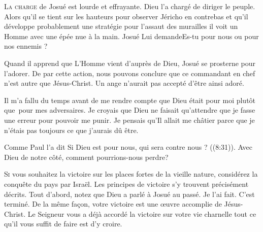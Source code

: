 \lettrine{L}{a charge} de Josué est lourde et effrayante.
 Dieu l'a chargé de diriger le peuple.
 Alors qu'il se tient sur les hauteurs pour observer Jéricho en contrebas
 \ocadr et qu'il développe probablement une stratégie
 pour l'assaut des murailles \fcadr{}
 il voit un Homme avec une épée nue à la main.
 Josué Lui demande\frcolon \Og Es-tu pour nous ou pour nos ennemis ? \Fg{}

Quand il apprend que L'Homme vient d'auprès de Dieu,
 Josué se prosterne pour l'adorer.
 De par cette action, nous pouvons conclure que ce commandant en chef
 n'est autre que Jésus-Christ. Un ange n'aurait pas accepté d'être ainsi adoré.

Il m'a fallu du temps avant de me rendre compte que Dieu
 était pour moi plutôt que~pour mes adversaires.
 Je croyais que Dieu ne faisait qu'attendre
 que je fasse une erreur pour pouvoir me punir.
 Je pensais qu'Il allait me châtier
 parce que je n'étais pas toujours ce que j'aurais dû être.


Comme Paul l'a dit\frcolon
 \Og Si Dieu est pour nous, qui sera contre nous ? \Fg{} ((8:31)).
 Avec Dieu de notre côté, comment pourrions-nous perdre? 

\dvrule






\lettrine{S}{i} vous souhaitez la victoire sur les places fortes
 de la vieille nature, considérez la conquête du pays par Israël.
 Les principes de victoire s'y trouvent précisément décrits.
 Tout d'abord, notez que Dieu a parlé à Josué au passé.
 \Og Je l'ai fait. C'est terminé. \Fg{}
 De la même fa\c{c}on, votre victoire est une \oe{}uvre accomplie de Jésus-Christ.
 Le Seigneur vous a déjà accordé la victoire sur votre vie charnelle
 \ocadr tout ce qu'il vous suffit de faire est d'y croire.

